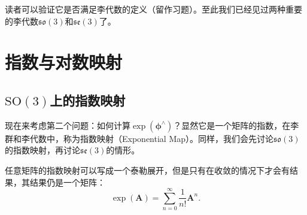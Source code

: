 读者可以验证它是否满足李代数的定义（留作习题）。至此我们已经见过两种重要的李代数$\mathfrak{so}(3)$和$\mathfrak{se}(3)$了。

\section{指数与对数映射}

\subsection{$\mathrm{SO}(3)$上的指数映射}

现在来考虑第二个问题：如何计算$\exp ( \bm{\phi}^{\wedge} )$？显然它是一个矩阵的指数，在李群和李代数中，称为指数映射（Exponential Map）。同样，我们会先讨论$\mathfrak{so}(3)$的指数映射，再讨论$\mathfrak{se}(3)$的情形。

任意矩阵的指数映射可以写成一个泰勒展开，但是只有在收敛的情况下才会有结果，其结果仍是一个矩阵：
\begin{equation}
\exp(\bm{A}) = \sum\limits_{n = 0}^\infty  {\frac{1}{{n!}}{ \bm{A}^n}}.
\end{equation}

